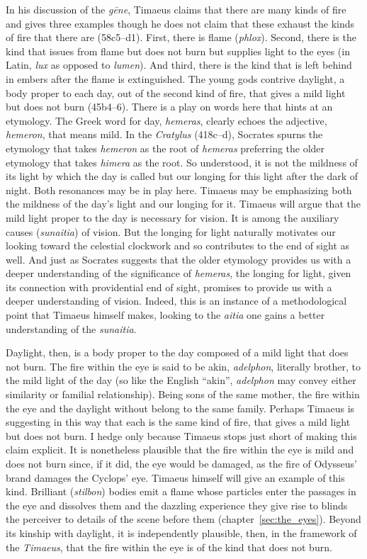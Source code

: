 In his discussion of the \emph{gēne}, Timaeus claims that there are many kinds of fire and gives three examples though he does not claim that these exhaust the kinds of fire that there are (58c5–d1). First, there is flame (\emph{phlox}). Second, there is the kind that issues from flame but does not burn but supplies light to the eyes (in Latin, \emph{lux} as opposed to \emph{lumen}). And third, there is the kind that is left behind in embers after the flame is extinguished. The young gods contrive daylight, a body proper to each day, out of the second kind of fire, that gives a mild light but does not burn (45b4--6). There is a play on words here that hints at an etymology. The Greek word for day, \emph{hemeras}, clearly echoes the adjective, \emph{hemeron}, that means mild. In the \emph{Cratylus} (418c--d), Socrates spurns the etymology that takes \emph{hemeron} as the root of \emph{hemeras} preferring the older etymology that takes \emph{himera} as the root. So understood, it is not the mildness of its light by which the day is called but our longing for this light after the dark of night. Both resonances may be in play here. Timaeus may be emphasizing both the mildness of the day's light and our longing for it. Timaeus will argue that the mild light proper to the day is necessary for vision. It is among the auxiliary causes (\emph{sunaitia}) of vision. But the longing for light naturally motivates our looking toward the celestial clockwork and so contributes to the end of sight as well. And just as Socrates suggests that the older etymology provides us with a deeper understanding of the significance of \emph{hemeras}, the longing for light, given its connection with providential end of sight, promises to provide us with a deeper understanding of vision. Indeed, this is an instance of a methodological point that Timaeus himself makes, looking to the \emph{aitia} one gains a better understanding of the \emph{sunaitia}.

Daylight, then, is a body proper to the day composed of a mild light that does not burn. The fire within the eye is said to be akin, \emph{adelphon}, literally brother, to the mild light of the day (so like the English ``akin'', \emph{adelphon} may convey either similarity or familial relationship). Being sons of the same mother, the fire within the eye and the daylight without belong to the same family. Perhaps Timaeus is suggesting in this way that each is the same kind of fire, that gives a mild light but does not burn. I hedge only because Timaeus stops just short of making this claim explicit. It is nonetheless plausible that the fire within the eye is mild and does not burn since, if it did, the eye would be damaged, as the fire of Odysseus' brand damages the Cyclops' eye. Timaeus himself will give an example of this kind. Brilliant (\emph{stilbon}) bodies emit a flame whose particles enter the passages in the eye and dissolves them and the dazzling experience they give rise to blinds the perceiver to details of the scene before them (chapter~\ref{sec:the_eyes}). Beyond its kinship with daylight, it is independently plausible, then, in the framework of the \emph{Timaeus}, that the fire within the eye is of the kind that does not burn.

